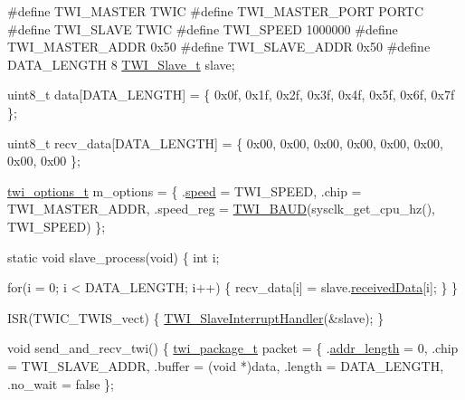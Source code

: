 \begin{DoxyCode}
\textcolor{preprocessor}{         #define TWI\_MASTER       TWIC}
\textcolor{preprocessor}{}\textcolor{preprocessor}{         #define TWI\_MASTER\_PORT  PORTC}
\textcolor{preprocessor}{}\textcolor{preprocessor}{         #define TWI\_SLAVE        TWIC}
\textcolor{preprocessor}{}\textcolor{preprocessor}{         #define TWI\_SPEED        1000000}
\textcolor{preprocessor}{}\textcolor{preprocessor}{         #define TWI\_MASTER\_ADDR  0x50}
\textcolor{preprocessor}{}\textcolor{preprocessor}{         #define TWI\_SLAVE\_ADDR   0x50}
\textcolor{preprocessor}{}
\textcolor{preprocessor}{         #define DATA\_LENGTH     8}
\textcolor{preprocessor}{}
         \hyperlink{struct_t_w_i___slave}{TWI\_Slave\_t} slave;

         uint8\_t data[DATA\_LENGTH] = \{
             0x0f, 0x1f, 0x2f, 0x3f, 0x4f, 0x5f, 0x6f, 0x7f
         \};

         uint8\_t recv\_data[DATA\_LENGTH] = \{
             0x00, 0x00, 0x00, 0x00, 0x00, 0x00, 0x00, 0x00
         \};

         \hyperlink{structtwi__options__t}{twi\_options\_t} m\_options = \{
             .\hyperlink{structtwi__options__t_ad81e7400d394a2f72d7ad84588d3d661}{speed}     = TWI\_SPEED,
             .chip      = TWI\_MASTER\_ADDR,
             .speed\_reg = \hyperlink{group__group__xmega__drivers__twi__twim_gaf373fdbc2054cf1a070ba2a24ddaedf3}{TWI\_BAUD}(sysclk\_get\_cpu\_hz(), TWI\_SPEED)
         \};

         \textcolor{keyword}{static} \textcolor{keywordtype}{void} slave\_process(\textcolor{keywordtype}{void}) \{
             \textcolor{keywordtype}{int} i;

             \textcolor{keywordflow}{for}(i = 0; i < DATA\_LENGTH; i++) \{
                 recv\_data[i] = slave.\hyperlink{struct_t_w_i___slave_a8c205728fdea8bcaeaa0f6f889d83d4d}{receivedData}[i];
             \}
         \}

         ISR(TWIC\_TWIS\_vect) \{
             \hyperlink{group__group__xmega__drivers__twi__twis_ga0b140fb1b0b3f204e5c748c5f585fbb2}{TWI\_SlaveInterruptHandler}(&slave);
         \}

         \textcolor{keywordtype}{void} send\_and\_recv\_twi()
         \{
             \hyperlink{structtwi__package__t}{twi\_package\_t} packet = \{
                 .\hyperlink{structtwi__package__t_a397e982e6fa809c3fb834309537ffdbd}{addr\_length} = 0,
                 .chip        = TWI\_SLAVE\_ADDR,
                 .buffer      = (\textcolor{keywordtype}{void} *)data,
                 .length      = DATA\_LENGTH,
                 .no\_wait     = \textcolor{keyword}{false}
             \};


\end{DoxyCode}
